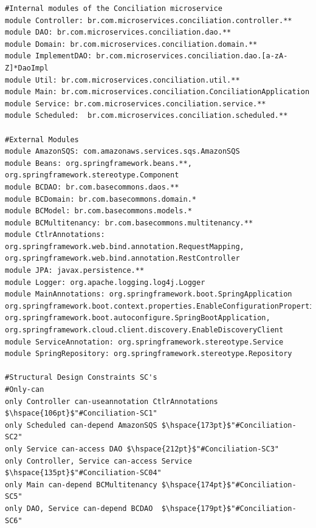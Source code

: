 \documentclass[12pt]{article}
\begin{document}
\begin{lstlisting}[style=colorido, caption={\textcolor{blue}{Conciliation microservice's architectural design specification.}},label={list:especArquiteturalConciliation}
]
#Internal modules of the Conciliation microservice
module Controller: br.com.microservices.conciliation.controller.**
module DAO: br.com.microservices.conciliation.dao.**
module Domain: br.com.microservices.conciliation.domain.**
module ImplementDAO: br.com.microservices.conciliation.dao.[a-zA-Z]*DaoImpl
module Util: br.com.microservices.conciliation.util.**
module Main: br.com.microservices.conciliation.ConciliationApplication
module Service: br.com.microservices.conciliation.service.**
module Scheduled:  br.com.microservices.conciliation.scheduled.**

#External Modules
module AmazonSQS: com.amazonaws.services.sqs.AmazonSQS
module Beans: org.springframework.beans.**, org.springframework.stereotype.Component
module BCDAO: br.com.basecommons.daos.**
module BCDomain: br.com.basecommons.domain.*
module BCModel: br.com.basecommons.models.*
module BCMultitenancy: br.com.basecommons.multitenancy.**
module CtlrAnnotations: org.springframework.web.bind.annotation.RequestMapping, org.springframework.web.bind.annotation.RestController
module JPA: javax.persistence.**
module Logger: org.apache.logging.log4j.Logger
module MainAnnotations: org.springframework.boot.SpringApplication org.springframework.boot.context.properties.EnableConfigurationProperties, org.springframework.boot.autoconfigure.SpringBootApplication, org.springframework.cloud.client.discovery.EnableDiscoveryClient
module ServiceAnnotation: org.springframework.stereotype.Service
module SpringRepository: org.springframework.stereotype.Repository

#Structural Design Constraints SC's
#Only-can
only Controller can-useannotation CtlrAnnotations $\hspace{106pt}$"#Conciliation-SC1"
only Scheduled can-depend AmazonSQS	$\hspace{173pt}$"#Conciliation-SC2"
only Service can-access DAO	$\hspace{212pt}$"#Conciliation-SC3"
only Controller, Service can-access Service $\hspace{135pt}$"#Conciliation-SC04"
only Main can-depend BCMultitenancy	$\hspace{174pt}$"#Conciliation-SC5"
only DAO, Service can-depend BCDAO	$\hspace{179pt}$"#Conciliation-SC6"
	

\end{lstlisting}
\end{document}
